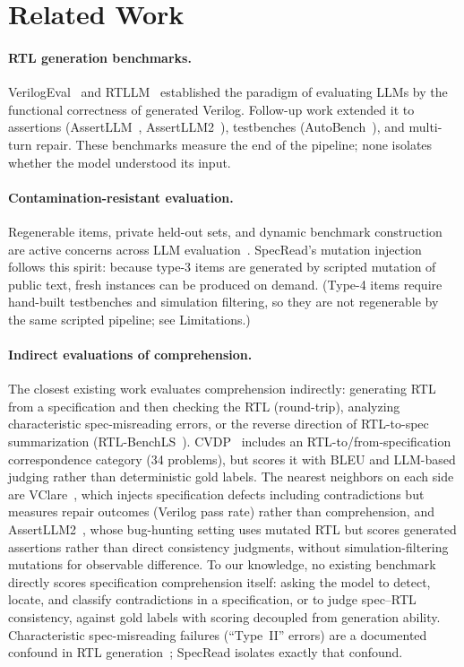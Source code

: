 \documentclass[11pt]{article}
\begin{document}
\section{Related Work}
\paragraph{RTL generation benchmarks.} VerilogEval~\cite{verilogeval,verilogeval2} and RTLLM~\cite{rtllm} established the paradigm of evaluating LLMs by the functional correctness of generated Verilog. Follow-up work extended it to assertions (AssertLLM~\cite{assertllm}, AssertLLM2~\cite{assertllm2}), testbenches (AutoBench~\cite{autobench}), and multi-turn repair. These benchmarks measure the end of the pipeline; none isolates whether the model understood its input.

\paragraph{Contamination-resistant evaluation.} Regenerable items, private held-out sets, and dynamic benchmark construction are active concerns across LLM evaluation~\cite{dynabench,livebench}. SpecRead's mutation injection follows this spirit: because type-3 items are generated by scripted mutation of public text, fresh instances can be produced on demand. (Type-4 items require hand-built testbenches and simulation filtering, so they are not regenerable by the same scripted pipeline; see Limitations.)

\paragraph{Indirect evaluations of comprehension.} The closest existing work evaluates comprehension indirectly: generating RTL from a specification and then checking the RTL (round-trip), analyzing characteristic spec-misreading errors, or the reverse direction of RTL-to-spec summarization (RTL-BenchLS~\cite{rtlbenschls}). CVDP~\cite{cvdp} includes an RTL-to/from-specification correspondence category (34 problems), but scores it with BLEU and LLM-based judging rather than deterministic gold labels. The nearest neighbors on each side are VClare~\cite{vclare}, which injects specification defects including contradictions but measures repair outcomes (Verilog pass rate) rather than comprehension, and AssertLLM2~\cite{assertllm2}, whose bug-hunting setting uses mutated RTL but scores generated assertions rather than direct consistency judgments, without simulation-filtering mutations for observable difference. To our knowledge, no existing benchmark directly scores specification comprehension itself: asking the model to detect, locate, and classify contradictions in a specification, or to judge spec--RTL consistency, against gold labels with scoring decoupled from generation ability. Characteristic spec-misreading failures (``Type~II'' errors) are a documented confound in RTL generation~\cite{zhang2025errors}; SpecRead isolates exactly that confound.
\end{document}
